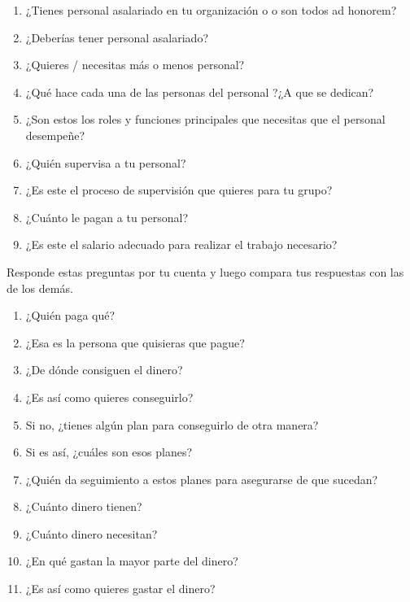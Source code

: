 \begin{enumerate}

\item
  ¿Tienes personal asalariado en tu organización o 
  o son todos ad honorem?

\item
  ¿Deberías tener personal asalariado?

\item
  ¿Quieres / necesitas más o menos personal?

\item
  ¿Qué hace cada una de las personas del personal ?¿A que se dedican?

\item
  ¿Son estos los roles y funciones principales que necesitas que el personal desempeñe?

\item
  ¿Quién supervisa a tu personal?

\item
  ¿Es este el proceso de supervisión que quieres para tu grupo?

\item
  ¿Cuánto le pagan a tu personal?

\item
  ¿Es este el salario adecuado para realizar el trabajo necesario?

\end{enumerate}


Responde estas preguntas por tu cuenta y
luego compara tus respuestas con las de los demás.

\begin{enumerate}

\item
  ¿Quién paga qué?

\item
  ¿Esa es la persona que quisieras que pague? 
\item
  ¿De dónde consiguen el dinero?

\item
  ¿Es así como quieres conseguirlo?

\item
  Si no, ¿tienes algún plan para conseguirlo de otra manera?

\item
  Si es así, ¿cuáles son esos planes?

\item
  ¿Quién da seguimiento a estos planes para asegurarse de que sucedan?

\item
  ¿Cuánto dinero tienen?

\item
  ¿Cuánto dinero necesitan?

\item
  ¿En qué gastan la mayor parte del dinero?

\item
  ¿Es así como quieres gastar el dinero?

\end{enumerate}

